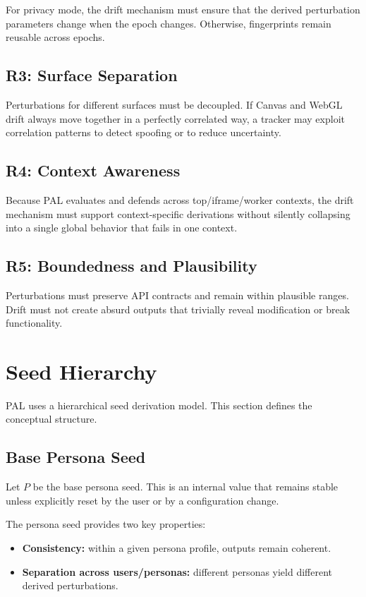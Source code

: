 \documentclass[11pt]{report}
\begin{document}
For privacy mode, the drift mechanism must ensure that the derived perturbation parameters change when the epoch changes. Otherwise, fingerprints remain reusable across epochs.

\subsection{R3: Surface Separation}

Perturbations for different surfaces must be decoupled. If Canvas and WebGL drift always move together in a perfectly correlated way, a tracker may exploit correlation patterns to detect spoofing or to reduce uncertainty.

\subsection{R4: Context Awareness}

Because PAL evaluates and defends across top/iframe/worker contexts, the drift mechanism must support context-specific derivations without silently collapsing into a single global behavior that fails in one context.

\subsection{R5: Boundedness and Plausibility}

Perturbations must preserve API contracts and remain within plausible ranges. Drift must not create absurd outputs that trivially reveal modification or break functionality.

\section{Seed Hierarchy}

PAL uses a hierarchical seed derivation model. This section defines the conceptual structure.

\subsection{Base Persona Seed}

Let $P$ be the base persona seed. This is an internal value that remains stable unless explicitly reset by the user or by a configuration change.

The persona seed provides two key properties:
\begin{itemize}
    \item \textbf{Consistency:} within a given persona profile, outputs remain coherent.
    \item \textbf{Separation across users/personas:} different personas yield different derived perturbations.
\end{itemize}
\end{document}
